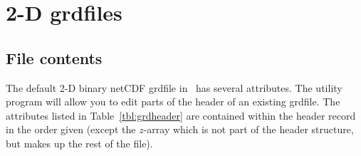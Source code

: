 \section{2-D grdfiles} 

\subsection{File contents}

The default 2-D binary netCDF grdfile in \GMT\ has several attributes.
The  utility program will allow you to edit parts of
the header of an existing grdfile.  The attributes listed in Table~\ref{tbl:grdheader}
are contained within the header record in the order given (except the $z$-array which
is not part of the header structure, but makes up the rest of the file).

